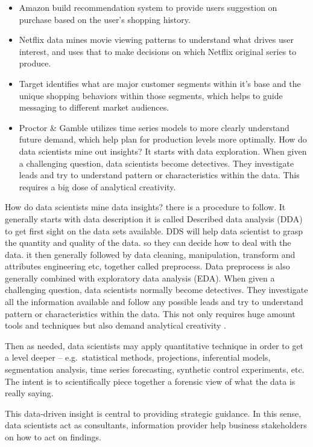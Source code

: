 \documentclass[
]{book}
\providecommand{\tightlist}{%
  \setlength{\itemsep}{0pt}\setlength{\parskip}{0pt}}
\begin{document}
\begin{itemize}
\tightlist
\item
  Amazon build recommendation system to provide users suggestion on purchase based on the user's shopping history.
\item
  Netflix data mines movie viewing patterns to understand what drives user interest, and uses that to make decisions on which Netflix original series to produce.
\item
  Target identifies what are major customer segments within it's base and the unique shopping behaviors within those segments, which helps to guide messaging to different market audiences.
\item
  Proctor \& Gamble utilizes time series models to more clearly understand future demand, which help plan for production levels more optimally.
  How do data scientists mine out insights? It starts with data exploration. When given a challenging question, data scientists become detectives. They investigate leads and try to understand pattern or characteristics within the data. This requires a big dose of analytical creativity.
\end{itemize}

How do data scientists mine data insights? there is a procedure to follow. It generally starts with data description it is called Described data analysis (DDA) to get first sight on the data sets available. DDS will help data scientist to grasp the quantity and quality of the data. so they can decide how to deal with the data. it then generally followed by data cleaning, manipulation, transform and attributes engineering etc, together called preprocess. Data preprocess is also generally combined with exploratory data analysis (EDA). When given a challenging question, data scientists normally become detectives. They investigate all the information available and follow any possible leads and try to understand pattern or characteristics within the data. This not only requires huge amount tools and techniques but also demand analytical creativity .

Then as needed, data scientists may apply quantitative technique in order to get a level deeper -- e.g.~statistical methods, projections, inferential models, segmentation analysis, time series forecasting, synthetic control experiments, etc. The intent is to scientifically piece together a forensic view of what the data is really saying.

This data-driven insight is central to providing strategic guidance. In this sense, data scientists act as consultants, information provider help business stakeholders on how to act on findings.
\end{document}
